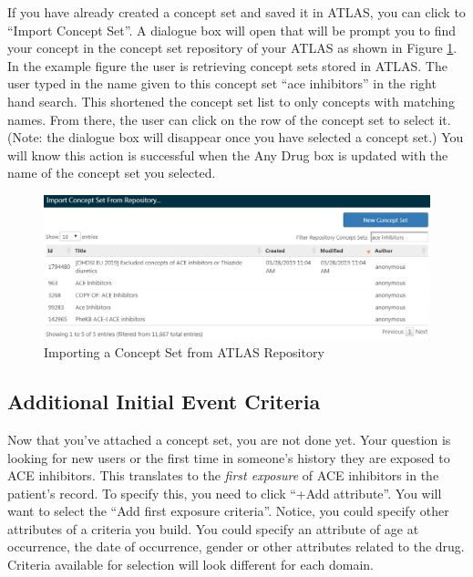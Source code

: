 \documentclass[11pt]{book}
\theoremstyle{definition}
\theoremstyle{definition}
\theoremstyle{definition}
\theoremstyle{remark}
\begin{document}
If you have already created a concept set and saved it in ATLAS, you can
click to ``Import Concept Set''. A dialogue box will open that will be
prompt you to find your concept in the concept set repository of your
ATLAS as shown in Figure \ref{fig:ATLASfindyourconcept}. In the example
figure the user is retrieving concept sets stored in ATLAS. The user
typed in the name given to this concept set ``ace inhibitors'' in the
right hand search. This shortened the concept set list to only concepts
with matching names. From there, the user can click on the row of the
concept set to select it. (Note: the dialogue box will disappear once
you have selected a concept set.) You will know this action is
successful when the Any Drug box is updated with the name of the concept
set you selected.

\begin{figure}

{\centering \includegraphics[width=1\linewidth]{images/Cohorts/ATLAS-findingyourconcept} 

}

\caption{Importing a Concept Set from ATLAS Repository}\label{fig:ATLASfindyourconcept}
\end{figure}

\subsection{Additional Initial Event
Criteria}\label{additional-initial-event-criteria}

Now that you've attached a concept set, you are not done yet. Your
question is looking for new users or the first time in someone's history
they are exposed to ACE inhibitors. This translates to the \emph{first
exposure} of ACE inhibitors in the patient's record. To specify this,
you need to click ``+Add attribute''. You will want to select the ``Add
first exposure criteria''. Notice, you could specify other attributes of
a criteria you build. You could specify an attribute of age at
occurrence, the date of occurrence, gender or other attributes related
to the drug. Criteria available for selection will look different for
each domain.
\end{document}
